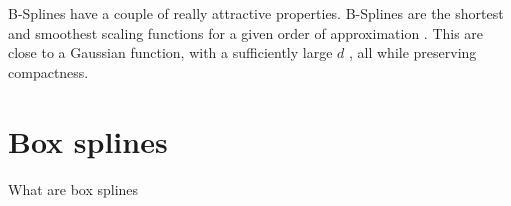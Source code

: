 B-Splines have a couple of really attractive properties. B-Splines are the shortest and smoothest
scaling functions for a given order of approximation \cite{momey_b-spline_2012}. This
are close to a Gaussian function,
with a sufficiently large $d$ \cite{momey_b-spline_2012}, all while preserving compactness.


\cite{unser_b-spline_1993}
\cite{unser_b-spline_1993-1}
\cite{unser_fast_1991}
\cite{briand_theory_2018}
 
\section{Box splines}

What are box splines

\cite{entezari_box_2012}
\cite{de_boor_box_1993}
